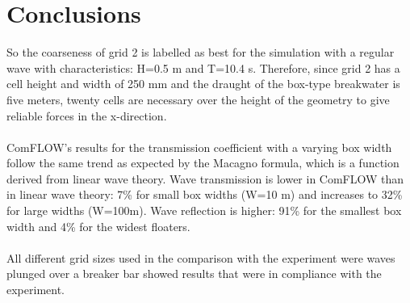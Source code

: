 






\section{Conclusions}

So the coarseness of grid 2 is labelled as best for the simulation with a regular wave with characteristics: H=0.5 m and T=10.4 s. Therefore, since grid 2 has a cell height and width of 250 mm and the draught of the box-type breakwater is five meters, twenty cells are necessary over the height of the geometry to give reliable forces in the x-direction. \\
\\
ComFLOW's results for the transmission coefficient with a varying box width follow the same trend as expected by the Macagno formula, which is a function derived from linear wave theory. Wave transmission is lower in ComFLOW than in linear wave theory: 7\% for small box widths (W=10 m) and increases to 32\% for large widths (W=100m). Wave reflection is higher: 91\% for the smallest box width and 4\% for the widest floaters. \\
\\
All different grid sizes used in the comparison with the experiment were waves plunged over a breaker bar showed results that were in compliance with the experiment. 